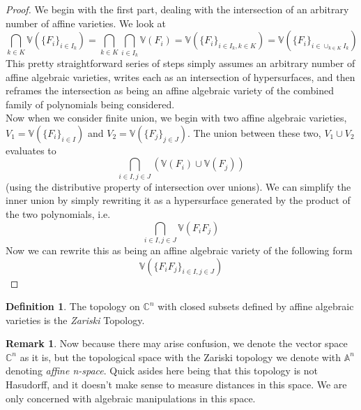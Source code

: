 \documentclass[12pt]{book}
\theoremstyle{definition}
\newtheorem*{defn}{Definition}
\newtheorem*{rem}{Remark}
\begin{document}
\begin{proof}
    We begin with the first part, dealing with the intersection of an arbitrary number of affine varieties. We look at $$\bigcap_{k \in K} \mathbb{V}(\{F_i\}_{i \in I_k}) = \bigcap_{k \in K} \bigcap_{i \in I_k} \mathbb{V}(F_i) = \mathbb{V}(\{F_i\}_{i \in I_k, k \in K}) = \mathbb{V}(\{F_i\}_{i \in \cup_{k \in K} I_k}) $$
    This pretty straightforward series of steps simply assumes an arbitrary number of affine algebraic varieties, writes each as an intersection of hypersurfaces, and then reframes the intersection as being an affine algebraic variety of the combined family of polynomials being considered.\\
    Now when we consider finite union, we begin with two affine algebraic varieties, $V_1 = \mathbb{V}(\{F_i\}_{i \in I})$ and $V_2 = \mathbb{V}(\{F_j\}_{j \in J})$. The union between these two, $V_1 \cup V_2$ evaluates to $$\bigcap_{i \in I, j \in J} (\mathbb{V}(F_i) \cup \mathbb{V}(F_j))$$ (using the distributive property of intersection over unions). We can simplify the inner union by simply rewriting it as a hypersurface generated by the product of the two polynomials, i.e. $$ \bigcap_{i \in I, j \in J} \mathbb{V}(F_iF_j)$$
    Now we can rewrite this as being an affine algebraic variety of the following form $$ \mathbb{V}(\{F_iF_j\}_{i \in I, j \in J})$$ 
\end{proof}

\begin{defn}
    The topology on $\mathbb{C}^n$ with closed subsets defined by affine algebraic varieties is the \textit{Zariski} Topology.
\end{defn}
\begin{rem}
    Now because there may arise confusion, we denote the vector space $\mathbb{C}^n$ as it is, but the topological space with the Zariski topology we denote with $\mathbb{A}^n$ denoting \textit{affine n-space}. Quick asides here being that this topology is not Hasudorff, and it doesn't make sense to measure distances in this space. We are only concerned with algebraic manipulations in this space.
\end{rem}
\end{document}
